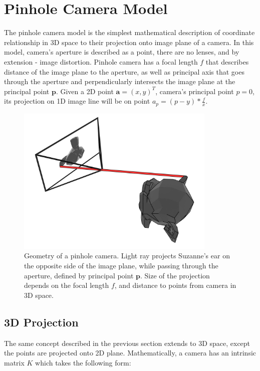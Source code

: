 \documentclass[11pt,english]{report}
\begin{document}
\section{Pinhole Camera Model}

The pinhole camera model is the simplest mathematical description of coordinate relationship in 3D space to their projection onto image plane of a camera. In this model, camera's aperture is described as a point, there are no lenses, and by extension - image distortion. Pinhole camera has a focal length $f$ that describes distance of the image plane to the aperture, as well as principal axis that goes through the aperture and perpendicularly intersects the image plane at the principal point $\mathbf{p}$. Given a 2D point $\mathbf{a} = (x, y)^T$, camera's principal point $p = 0$, its projection on 1D image line will be on point $a_p = (p - y) * \frac{f}{x}$.

\begin{figure}[!ht]
	\centering
	\includegraphics[width=270pt]{docs/report/pinhole-camera.jpg}
	\caption{\centering Geometry of a pinhole camera. Light ray projects Suzanne's ear on the opposite side of the image plane, while passing through the aperture, defined by principal point $\mathbf{p}$. Size of the projection depends on the focal length $f$, and distance to points from camera in 3D space.}
\end{figure}

\subsection{3D Projection}

The same concept described in the previous section extends to 3D space, except the points are projected onto 2D plane. Mathematically, a camera has an intrinsic matrix $K$ which takes the following form:
\end{document}
